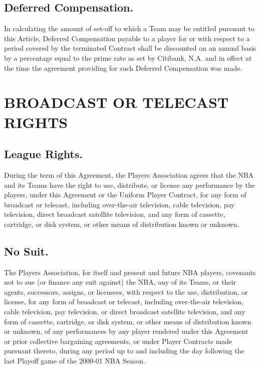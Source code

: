 \documentclass[
]{book}
\begin{document}
\hypertarget{deferred-compensation.}{%
\section{Deferred Compensation.}\label{deferred-compensation.}}

In calculating the amount of set-off to which a Team may be entitled pursuant to this Article, Deferred Compensation payable to a player for or with respect to a period covered by the terminated Contract shall be discounted on an annual basis by a percentage equal to the prime rate as set by Citibank, N.A. and in effect at the time the agreement providing for such Deferred Compensation was made.

\hypertarget{broadcast-or-telecast-rights}{%
\chapter{BROADCAST OR TELECAST RIGHTS}\label{broadcast-or-telecast-rights}}

\hypertarget{league-rights.}{%
\section{League Rights.}\label{league-rights.}}

During the term of this Agreement, the Players Association agrees that the NBA and its Teams have the right to use, distribute, or license any performance by the players, under this Agreement or the Uniform Player Contract, for any form of broadcast or telecast, including over-the-air television, cable television, pay television, direct broadcast satellite television, and any form of cassette, cartridge, or disk system, or other means of distribution known or unknown.

\hypertarget{no-suit.}{%
\section{No Suit.}\label{no-suit.}}

The Players Association, for itself and present and future NBA players, covenants not to sue (or finance any suit against) the NBA, any of its Teams, or their agents, successors, assigns, or licensees, with respect to the use, distribution, or license, for any form of broadcast or telecast, including over-the-air television, cable television, pay television, or direct broadcast satellite television, and any form of cassette, cartridge, or disk system, or other means of distribution known or unknown, of any performances by any player rendered under this Agreement or prior collective bargaining agreements, or under Player Contracts made pursuant thereto, during any period up to and including the day following the last Playoff game of the 2000-01 NBA Season.
\end{document}
